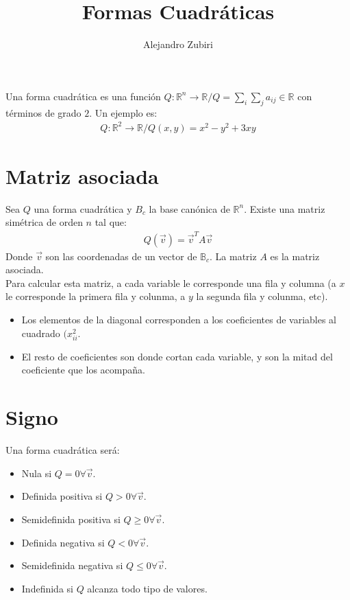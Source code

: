 \documentclass{article}
\author{Alejandro Zubiri}
\title{Formas Cuadráticas}
\begin{document}
\maketitle
Una forma cuadrática es una función $Q: \mathbb{R}^{n} \to \mathbb{R} /
Q = \sum_{i} \sum_{j}a_{ij} \in \mathbb{R}$ con términos de grado $2$. Un ejemplo es:
\begin{equation}
	\begin{split}
		Q: \mathbb{R}^{2} \to \mathbb{R} / Q(x,y)=x^{2}-y^{2}+3xy
	\end{split}
\end{equation}
\section{Matriz asociada}
Sea $Q$ una forma cuadrática y $B_{c}$ la base canónica de $\mathbb{R}^{n}$. Existe
una matriz simétrica de orden $n$ tal que:
\begin{equation}
	\begin{split}
		Q(\vec{v}) = \vec{v}^{T}A \vec{v}
	\end{split}
\end{equation}
Donde $\vec{v}$ son las coordenadas de un vector de $\mathbb{B}_{c}$. La matriz
$A$ es la matriz asociada.\\
Para calcular esta matriz, a cada variable le corresponde una fila y columna
(a $x$ le corresponde la primera fila y colunma, a $y$ la segunda fila y colunma, etc).
\begin{itemize}
	\item Los elementos de la diagonal corresponden a los coeficientes de variables
		al cuadrado $(x_{ii}^{2}$.
	\item El resto de coeficientes son donde cortan cada variable, y son la mitad
		del coeficiente que los acompaña.
\end{itemize}
\section{Signo}
Una forma cuadrática será:
\begin{itemize}
	\item Nula si $Q=0 \forall \vec{v}$.
	\item Definida positiva si $Q > 0 \forall \vec{v}$.
	\item Semidefinida positiva si $Q \geq 0 \forall \vec{v}$.
	\item Definida negativa si $Q < 0 \forall \vec{v}$.
	\item Semidefinida negativa si $Q \leq 0 \forall \vec{v}$.
	\item Indefinida si $Q$ alcanza todo tipo de valores. 
\end{itemize}
\end{document}
